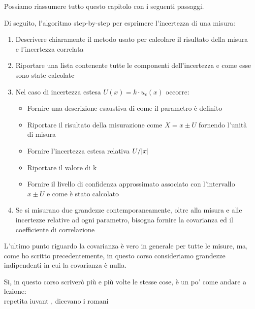 Possiamo riassumere tutto questo capitolo con i seguenti passaggi. \newline 

Di seguito, l'algoritmo step-by-step per esprimere l'incertezza di una misura: 

\begin{enumerate}
    \item Descrivere chiaramente il metodo usato per calcolare il risultato della misura e l'incertezza correlata 
    \item  Riportare una lista contenente tutte le componenti dell'incertezza e come esse sono state calcolate 
    \item Nel caso di incertezza estesa $U(x) = k \cdot u_c (x)$ occorre: 
    \begin{itemize}
        \item Fornire una descrizione esaustiva di come il parametro è definito 
        \item Riportare il risultato della misurazione come $X = x \pm U$ fornendo l'unità di misura 
        \item Fornire l'incertezza estesa relativa $U / \abs{x}$ 
        \item Riportare il valore di k 
        \item Fornire il livello di confidenza approssimato associato con l'intervallo $x \pm U$ e come è stato calcolato
    \end{itemize}
    \item Se si misurano due grandezze contemporaneamente, oltre alla misura e alle incertezze relative ad ogni parametro, bisogna fornire la covarianza ed il coefficiente di correlazione
\end{enumerate}

\begin{tcolorbox}
    L'ultimo punto riguardo la covarianza è vero in generale per tutte le misure, ma, come ho scritto precedentemente, in questo corso consideriamo grandezze indipendenti 
    in cui la covarianza è nulla. \newline 

    Si, in questo corso scriverò più e più volte le stesse cose, è un po' come andare a lezione: \\ 
    repetita iuvant , dicevano i romani
\end{tcolorbox}

\newpage 

